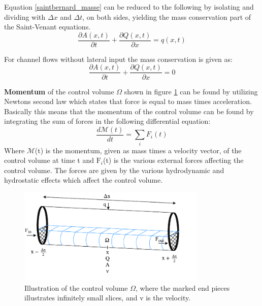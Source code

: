 Equation \ref{saintbernard_masse} can be reduced to the following by isolating and dividing with $\Delta x$ and $\Delta t$, on both sides, yielding the mass conservation part of the Saint-Venant equations.
\begin{equation}	
\frac{\partial A(x,t)}{\partial t} + \frac{\partial Q(x,t)}{\partial x}=q(x,t)
\label{saintbernard_mass_lateral}
\end{equation}

For channel flows without lateral input the mass conservation is given as:
\begin{equation}	
\boxed{\frac{\partial A(x,t)}{\partial t} + \frac{\partial Q(x,t)}{\partial x}=0}
\label{saintbernard_mass}
\end{equation}


\textbf{Momentum} of the control volume $\Omega$ shown in figure \ref{fig:momentum_picture} can be found by utilizing Newtons second law which states that force is equal to mass times acceleration.  
Basically this means that the momentum of the control volume can be found by integrating the sum of forces in the following differential equation:
\begin{equation}\label{eq:momentum_eq}
	\frac{d \mathcal{M}(t)}{dt} = \sum_{i}F_i(t)
\end{equation} 
Where $\mathcal{M}$(t) is the momentum, given as mass times a velocity vector, of the control volume at time t and $\text{F}_i$(t) is the various external forces affecting the control volume. The forces are given by the various hydrodynamic and hydrostatic effects which affect the control volume.  

\begin{figure}[H]
\centering
\includegraphics[width=0.8\textwidth]{report/modeling/pictures/momentum_fig.pdf}
\caption{Illustration of the control volume $\Omega$, where the marked end pieces illustrates infinitely small slices, and v is the velocity.}
\label{fig:momentum_picture}
\end{figure}

